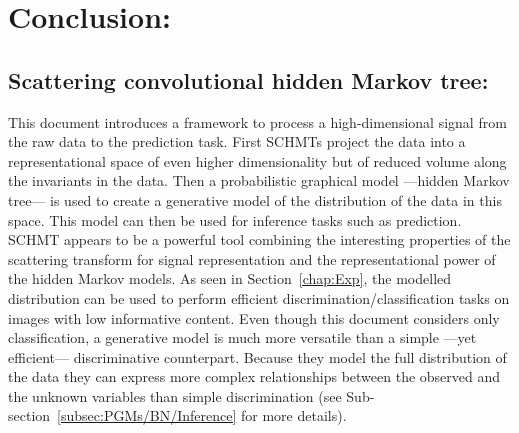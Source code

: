 \documentclass[a4paper,11pt]{report}
\begin{document}
		
\chapter{Conclusion:}
	\label{chap:ccl}

  \section{Scattering convolutional hidden Markov tree:}
		This document introduces a framework to process a high-dimensional signal from the raw data to the prediction task. First SCHMTs project the data into a representational space of even higher dimensionality but of reduced volume along the invariants in the data. Then a probabilistic graphical model ---hidden Markov tree--- is used to create a generative model of the distribution of the data in this space. This model can then be used for inference tasks such as prediction.\\
  
		SCHMT appears to be a powerful tool combining the interesting properties of the scattering transform for signal representation and the representational power of the hidden Markov models. As seen in Section~\ref{chap:Exp}, the modelled distribution can be used to perform efficient discrimination/classification tasks on images with low informative content. Even though this document considers only classification, a generative model is much more versatile than a simple ---yet efficient--- discriminative counterpart. Because they model the full distribution of the data they can express more complex relationships between the observed and the unknown variables than simple discrimination (see Sub-section~\ref{subsec:PGMs/BN/Inference} for more details).
  
    
\end{document}
